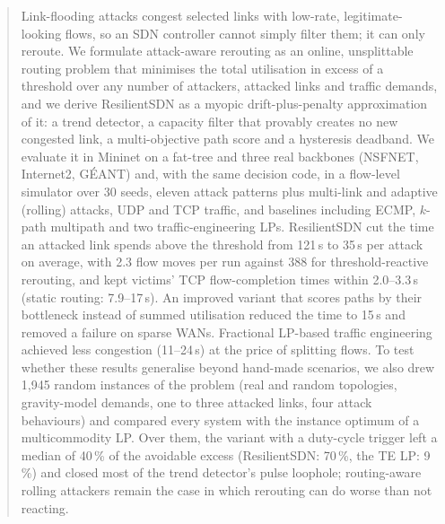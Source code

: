 
\begin{abstract}
Link-flooding attacks congest selected links with low-rate, legitimate-looking flows, so an SDN
controller cannot simply filter them; it can only reroute. We formulate attack-aware rerouting as an
online, unsplittable routing problem that minimises the total utilisation in excess of a threshold
over any number of attackers, attacked links and traffic demands, and we derive ResilientSDN as a
myopic drift-plus-penalty approximation of it: a trend detector, a capacity filter that provably
creates no new congested link, a multi-objective path score and a hysteresis deadband. We evaluate it
in Mininet on a fat-tree and three real backbones (NSFNET, Internet2, G\'EANT) and, with the same
decision code, in a flow-level simulator over 30 seeds, eleven attack patterns plus multi-link and
adaptive (rolling) attacks, UDP and TCP traffic, and baselines including ECMP, $k$-path multipath and
two traffic-engineering LPs. ResilientSDN cut the time an attacked link spends above the threshold from
121\,s to 35\,s per attack on average, with 2.3 flow moves per run against 388 for threshold-reactive
rerouting, and kept victims' TCP flow-completion times within 2.0--3.3\,s (static routing:
7.9--17\,s). An improved variant that scores paths by their bottleneck instead of summed utilisation
reduced the time to 15\,s and removed a failure on sparse WANs. Fractional LP-based traffic
engineering achieved less congestion (11--24\,s) at the price of splitting flows. To test whether
these results generalise beyond hand-made scenarios, we also drew 1{,}945 random instances of the
problem (real and random topologies, gravity-model demands, one to three attacked links, four attack
behaviours) and compared every system with the instance optimum of a multicommodity LP. Over them,
the variant with a duty-cycle trigger left a median of 40\,\% of the avoidable excess (ResilientSDN:
70\,\%, the TE LP: 9\,\%) and closed most of the trend detector's pulse loophole; routing-aware rolling
attackers remain the case in which rerouting can do worse than not reacting.
\end{abstract}

